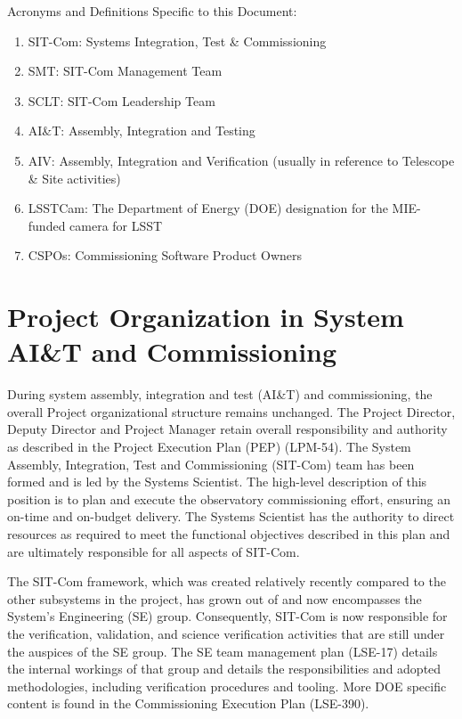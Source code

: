 \documentclass[SE,lsstdraft,authoryear,toc]{lsstdoc}
\begin{document}
Acronyms and Definitions Specific to this Document:
\begin{enumerate}
    \item SIT-Com: Systems Integration, Test \& Commissioning
    \item SMT: SIT-Com Management Team
    \item SCLT: SIT-Com Leadership Team
    \item AI\&T: Assembly, Integration and Testing
    \item AIV: Assembly, Integration and Verification (usually in reference to Telescope \& Site activities)
    \item LSSTCam: The Department of Energy (DOE) designation for the MIE-funded camera for LSST
    \item CSPOs: Commissioning Software Product Owners
\end{enumerate}

\section{Project Organization in System AI\&T and Commissioning}
\label{sec:project_organization}

During system assembly, integration and test (AI\&T) and commissioning, the overall Project organizational structure remains unchanged.
The Project Director, Deputy Director and Project Manager retain overall responsibility and authority as described in the Project Execution Plan (PEP) (LPM-54).
The System Assembly, Integration, Test and Commissioning (SIT-Com) team has been formed and is led by the Systems Scientist.
The high-level description of this position is to plan and execute the observatory commissioning effort, ensuring an on-time and on-budget delivery.
The Systems Scientist has the authority to direct resources as required to meet the functional objectives described in this plan and are ultimately responsible for all aspects of SIT-Com.

The SIT-Com framework, which was created relatively recently compared to the other subsystems in the project, has grown out of and now encompasses the System’s Engineering (SE) group.
Consequently, SIT-Com is now responsible for the verification, validation, and science verification activities that are still under the auspices of the SE group.
The SE team management plan (LSE-17) details the internal workings of that group and details the responsibilities and adopted methodologies, including verification procedures and tooling.
More DOE specific content is found in the Commissioning Execution Plan (LSE-390).
\end{document}
